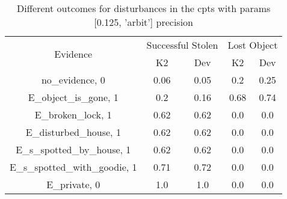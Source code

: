 \begin{table}\begin{tabular}{c|cc|cc}\toprule\multirow{2}{*}{Evidence} & \multicolumn{2}{c}{Successful Stolen} & \multicolumn{2}{c}{Lost Object} \\& {K2} & {Dev} & {K2} & {Dev} \\\midrule
no\_evidence, 0 & \cellcolor{Bittersweet}0.06&\cellcolor{Bittersweet}0.05&\cellcolor{Bittersweet}0.2&\cellcolor{Bittersweet}0.25\\E\_object\_is\_gone, 1 & \cellcolor{Bittersweet}0.2&\cellcolor{Bittersweet}0.16&\cellcolor{Bittersweet}0.68&\cellcolor{Bittersweet}0.74\\E\_broken\_lock, 1 & 0.62&0.62&0.0&0.0\\E\_disturbed\_house, 1 & 0.62&0.62&0.0&0.0\\E\_s\_spotted\_by\_house, 1 & 0.62&0.62&0.0&0.0\\E\_s\_spotted\_with\_goodie, 1 & \cellcolor{Bittersweet}0.71&\cellcolor{Bittersweet}0.72&0.0&0.0\\E\_private, 0 & 1.0&1.0&0.0&0.0\\\bottomrule\end{tabular}\caption{Different outcomes for disturbances in the cpts with params [0.125, 'arbit'] precision}\end{table}